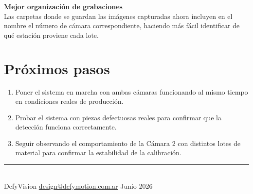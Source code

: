 \documentclass[11pt, a4paper]{article}
\begin{document}
\begin{abox}
\textbf{Mejor organización de grabaciones}\\[4pt]
Las carpetas donde se guardan las imágenes capturadas ahora incluyen en el nombre
el número de cámara correspondiente, haciendo más fácil identificar de qué estación
proviene cada lote.
\end{abox}

\section{Próximos pasos}

\begin{nbox}
\begin{enumerate}
  \item Poner el sistema en marcha con ambas cámaras funcionando al mismo tiempo en
        condiciones reales de producción.
  \item Probar el sistema con piezas defectuosas reales para confirmar que la
        detección funciona correctamente.
  \item Seguir observando el comportamiento de la Cámara 2 con distintos lotes de
        material para confirmar la estabilidad de la calibración.
\end{enumerate}
\end{nbox}

\vspace{16pt}
{\color{bordergray}\rule{\textwidth}{0.6pt}}\\[4pt]
{\small\color{textsub}
  DefyVision\quad\textbullet\quad
  \href{mailto:design@defymotion.com.ar}{design@defymotion.com.ar}\quad\textbullet\quad
  Junio 2026
}
\end{document}
